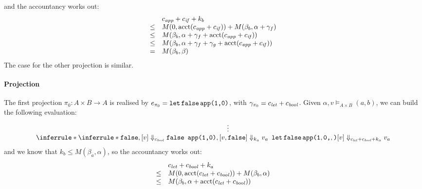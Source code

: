 \documentclass{workingnote}
\newcommand{\account}{\mathrm{acct}}
\begin{document}
and the accountancy works out:
\begin{displaymath}
  \begin{array}{cl}
    &\cnstApp + \cnstIf + k_b \\
    \leq & M(0, \account(\cnstApp + \cnstIf)) + M(\beta_b, \alpha + \gamma_f) \\
    \leq & M(\beta_b, \alpha + \gamma_f + \account(\cnstApp + \cnstIf)) \\
    \leq & M(\beta_b, \alpha + \gamma_f + \gamma_g + \account(\cnstApp + \cnstIf)) \\
    =    & M(\beta_b, \beta) \\
  \end{array}
\end{displaymath}
The case for the other projection is similar.

\paragraph{Projection} The first projection $\pi_0 : A \times B \to A$
is realised by $e_{\pi_0} = \texttt{let}\,\texttt{false}\,\texttt{app(}\texttt{1}\texttt{,}\texttt{0}\texttt{)}$,
with $\gamma_{\pi_0} = c_{\mathit{let}} + c_{\mathit{bool}}$. Given
$\alpha, v \models_{A \times B} (a,b)$, we can build the following
evaluation:
\begin{displaymath}
  \inferrule*
  { \inferrule*
    { }
    {\False, [v] \Downarrow_{\cnstBool} \False} \\
    {\begin{array}[b]{c} \vdots \\ \Apply{\Idx{1}}{\Idx{0}}, [v, \False] \Downarrow_{k_a} v_a\end{array}}
  }
  {\Let\,\False\,\Apply{\Idx{1},\Idx{0}}, [v] \Downarrow_{\cnstLet + \cnstBool + k_a} v_a}
\end{displaymath}
and we know that $k_b \leq M(\beta_a, \alpha)$, so the accountancy
works out:
\begin{displaymath}
  \begin{array}{cl}
    &\cnstLet + \cnstBool + k_a \\
    \leq & M(0,\account(\cnstLet + \cnstBool)) + M(\beta_b, \alpha) \\
    \leq & M(\beta_b, \alpha + \account(\cnstLet + \cnstBool))
  \end{array}
\end{displaymath}


\end{document}
